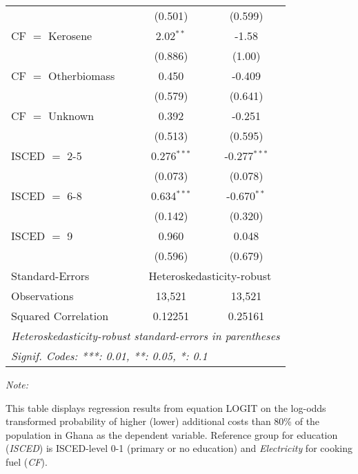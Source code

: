 \begin{table}[htbp!]
\begin{adjustbox}{width = 1\textwidth, max height = 0.95\textheight, center}
\begin{threeparttable}[b]
\begin{tabular}{lcc}
                                 & (0.501)       & (0.599)\\   
            CF $=$ Kerosene      & 2.02$^{**}$   & -1.58\\   
                                 & (0.886)       & (1.00)\\   
            CF $=$ Otherbiomass  & 0.450         & -0.409\\   
                                 & (0.579)       & (0.641)\\   
            CF $=$ Unknown       & 0.392         & -0.251\\   
                                 & (0.513)       & (0.595)\\   
            ISCED $=$ 2-5        & 0.276$^{***}$ & -0.277$^{***}$\\   
                                 & (0.073)       & (0.078)\\   
            ISCED $=$ 6-8        & 0.634$^{***}$ & -0.670$^{**}$\\   
                                 & (0.142)       & (0.320)\\   
            ISCED $=$ 9          & 0.960         & 0.048\\   
                                 & (0.596)       & (0.679)\\   
            \midrule 
            Standard-Errors & \multicolumn{2}{c}{Heteroskedasticity-robust} \\ 
            Observations         & 13,521        & 13,521\\  
            Squared Correlation  & 0.12251       & 0.25161\\  
            \midrule \midrule
            \multicolumn{3}{l}{\emph{Heteroskedasticity-robust standard-errors in parentheses}}\\
            \multicolumn{3}{l}{\emph{Signif. Codes: ***: 0.01, **: 0.05, *: 0.1}}\\
         \end{tabular}
         
         \begin{tablenotes}\item \medskip \textit{Note:}
            \item This table displays regression results from equation LOGIT on the log-odds transformed probability of higher (lower) additional costs than 80\% of the population in Ghana as the dependent variable. Reference group for education (\textit{ISCED}) is ISCED-level 0-1 (primary or no education) and \textit{Electricity} for cooking fuel (\textit{CF}).
         \end{tablenotes}
      \end{threeparttable}
   \end{adjustbox}
\end{table}


